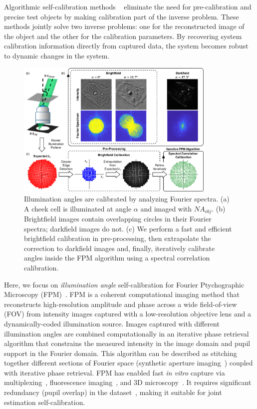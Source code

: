Algorithmic self-calibration methods ~\cite{Thibault2009,Ou:14,Horstmeyer:14,Yeh2015,Sun:16LEDpos,Liu:17, maiden2012annealing, zhang2013translation,Bian:13,Bian:16,Dou2017,Eckert:16,Satat2016,Pan2017,Chung:16fluor} eliminate the need for pre-calibration and precise test objects by making calibration part of the inverse problem. These methods jointly solve two inverse problems: one for the reconstructed image of the object and the other for the calibration parameters. By recovering system calibration information directly from captured data, the system becomes robust to dynamic changes in the system.

\begin{figure}[t]
	\centering
	\includegraphics[width=0.85\textwidth]{figures/fig_selfcal_fpm_overview.pdf}
	\caption{Illumination angles are calibrated by analyzing Fourier spectra. (a) A cheek cell is illuminated at angle $\alpha$ and imaged with $NA_{obj}$. (b) Brightfield images contain overlapping circles in their Fourier spectra; darkfield images do not. (c) We perform a fast and efficient brightfield calibration in pre-processing, then extrapolate the correction to darkfield images and, finally, iteratively calibrate angles inside the FPM algorithm using a spectral correlation calibration.
		}
	\label{fig:self_cal_fpm_overview}
\end{figure}

Here, we focus on \textit{illumination angle} self-calibration for Fourier Ptychographic Microscopy (FPM)~\cite{Zheng2013}. FPM is a coherent computational imaging method that reconstructs high-resolution amplitude and phase across a wide field-of-view (FOV) from intensity images captured with a low-resolution objective lens and a dynamically-coded illumination source. Images captured with different illumination angles are combined computationally in an iterative phase retrieval algorithm that constrains the measured intensity in the image domain and pupil support in the Fourier domain. This algorithm can be described as stitching together different sections of Fourier space (synthetic aperture imaging~\cite{Turpin:1995,Di:08}) coupled with iterative phase retrieval. FPM has enabled fast \textit{in vitro} capture via multiplexing~\cite{Tian2014,tian2015quantitative}, fluorescence imaging~\cite{Chung:16fluor}, and 3D microscopy~\cite{tian20153d,Horstmeyer:16}. It requires significant redundancy (pupil overlap) in the dataset~\cite{Dong:14,Sun:16}, making it suitable for joint estimation self-calibration.

